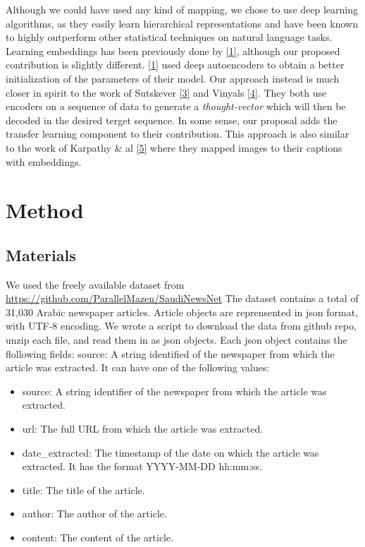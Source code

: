 \documentclass[12pt]{article}
\begin{document}
Although we could have used any kind of mapping, we chose to use deep
learning algorithms, as they easily learn hierarchical representations
and have been known to highly outperform other statistical techniques on
natural language tasks. Learning embeddings has been previously done by
\href{References}{{[}1{]}}, although our proposed contribution is
slightly different. \href{References}{{[}1{]}} used deep autoencoders to
obtain a better initialization of the parameters of their model. Our
approach instead is much closer in spirit to the work of Sutskever
\href{References}{{[}3{]}} and Vinyals \href{References}{{[}4{]}}. They
both use encoders on a sequence of data to generate a
\emph{thought-vector} which will then be decoded in the desired terget
sequence. In some sense, our proposal adds the transfer learning
component to their contribution. This approach is also similar to the
work of Karpathy \& al \href{References}{{[}5{]}} where they mapped
images to their captions with embeddings.

\section{Method}\label{method}
\subsection{Materials}
We used the freely available dataset from
\url{https://github.com/ParallelMazen/SaudiNewsNet} The dataset contains
a total of 31,030 Arabic newspaper articles. Article objects are reprensented in json
format, with UTF-8 encoding. We wrote a script to download the data from
github repo, unzip each file, and read them in as json objects. Each json object 
contains the flollowing fields:
source: A string identified of the newspaper from which the article was extracted. It can have one of the following values:
\begin{itemize}
\item source: A string identifier of the newspaper from which the article was extracted.
\item url: The full URL from which the article was extracted.
\item date\_extracted: The timestamp of the date on which the article was extracted. It has the format YYYY-MM-DD hh:mm:ss. 
\item title: The title of the article. 
\item author: The author of the article.
\item content: The content of the article.
\end{itemize}
\end{document}
